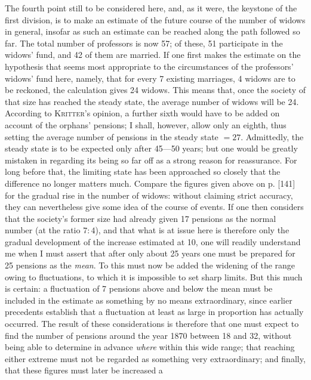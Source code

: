 The fourth point still to be considered here, and, as it were, the keystone of the first division, is to make an estimate of the future course of the number of widows in general, insofar as such an estimate can be reached along the path followed so far. The total number of professors is now 57; of these, 51 participate in the widows' fund, and 42 of them are married. If one first makes the estimate on the hypothesis that seems most appropriate to the circumstances of the professors' widows' fund here, namely, that for every 7 existing marriages, 4 widows are to be reckoned, the calculation gives 24 widows. This means that, once the society of that size has reached the steady state, the average number of widows will be 24. According to \textsc{Kritter}'s opinion, a further sixth would have to be added on account of the orphans' pensions; I shall, however, allow only an eighth, thus setting the average number of pensions in the steady state \(=27\). Admittedly, the steady state is to be expected only after 45—50 years; but one would be greatly mistaken in regarding its being so far off as a strong reason for reassurance. For long before that, the limiting state has been approached so closely that the difference no longer matters much. Compare the figures given above on p. [141] for the gradual rise in the number of widows: without claiming strict accuracy, they can nevertheless give some idea of the course of events. If one then considers that the society's former size had already given 17 pensions as the normal number (at the ratio \(7:4\)), and that what is at issue here is therefore only the gradual development of the increase estimated at 10, one will readily understand me when I must assert that after only about 25 years one must be prepared for 25 pensions as the \textit{mean}. To this must now be added the widening of the range owing to fluctuations, to which it is impossible to set sharp limits. But this much is certain: a fluctuation of 7 pensions above and below the mean must be included in the estimate as something by no means extraordinary, since earlier precedents establish that a fluctuation at least as large in proportion has actually occurred. The result of these considerations is therefore that one must expect to find the number of pensions around the year 1870 between 18 and 32, without being able to determine in advance \textit{where} within this wide range; that reaching either extreme must not be regarded as something very extraordinary; and finally, that these figures must later be increased a
